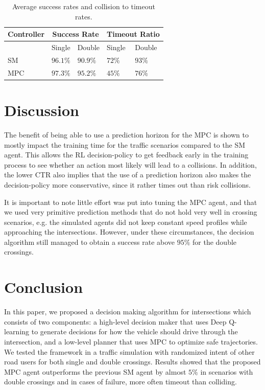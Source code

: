 \begin{table}[t!]
	\centering
	\caption{Average success rates and collision to timeout rates.}%
\begin{tabular}{ |p{}||p{}|p{}|p{}|p{}|}
	\hline
	Controller &\multicolumn{2}{|c|}{Success Rate}
	&\multicolumn{2}{|c|}{Timeout Ratio}\\
	\hline
	 & Single & Double & Single & Double\\
	\hline
	SM & $96.1\%$ & $90.9\%$ & $72\%$ & $93\%$\\
	MPC & $97.3\%$ & $95.2\%$ & $45\%$ & $76\%$\\
	\hline
\end{tabular}
\label{tab:successrate}
\end{table}
\section{Discussion}\label{sec:discussion}
The benefit of being able to use a prediction horizon for the MPC is shown to mostly impact the training time for the traffic scenarios compared to the SM agent. This allows the RL decision-policy to get feedback early in the training process to see whether an action most likely will lead to a collisions. In addition, the lower CTR also implies that the use of a prediction horizon also makes the decision-policy more conservative, since it rather times out than risk collisions.

It is important to note little effort was put into tuning the MPC agent, and that we used very primitive prediction methods that do not hold very well in crossing scenarios, e.g. the simulated agents did not keep constant speed profiles while approaching the intersections. However, under these circumstances, the decision algorithm still managed  to obtain a success rate above  $95\%$ for the double crossings.

\section{Conclusion}\label{sec:conclusion}
In this paper, we proposed a decision making algorithm for intersections which consists of two components: a high-level decision maker that uses Deep Q-learning to generate decisions for how the vehicle should drive through the intersection, and a low-level planner that uses MPC  to optimize safe trajectories. We tested the framework in a traffic simulation with randomized intent of other road users for both single and double crossings. Results showed that the proposed MPC agent outperforms the previous SM agent by almost $5\%$ in scenarios with double crossings and in cases of failure, more often timeout than colliding.
